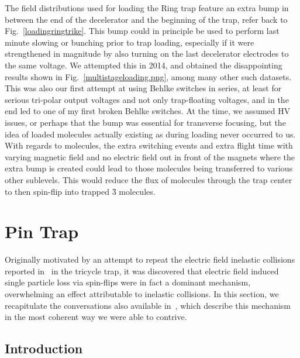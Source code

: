 The field distributions used for loading the Ring trap feature an extra bump in between the end of the decelerator and the beginning of the trap, refer back to Fig.~\ref{loadingringtrike}.
This bump could in principle be used to perform last minute slowing or bunching prior to trap loading, especially if it were strengthened in magnitude by also turning on the last decelerator electrodes to the same voltage.
We attempted this in 2014, and obtained the disappointing results shown in Fig.~\ref{multistageloading.png}, among many other such datasets.
This was also our first attempt at using Behlke switches in series, at least for serious tri-polar output voltages and not only trap-floating voltages, and in the end led to one of my first broken Behlke switches.
At the time, we assumed HV issues, or perhaps that the bump was essential for transverse focusing, but the idea of loaded molecules actually existing as  during loading never occurred to us.
With regards to  molecules, the extra switching events and extra flight time with varying magnetic field and no electric field out in front of the magnets where the extra bump is created could lead to those molecules being transferred to various other sublevels.
This would reduce the flux of  molecules through the trap center to then spin-flip into trapped \f3 molecules.



\section{Pin Trap}

Originally motivated by an attempt to repeat the electric field inelastic collisions reported in~\cite{Stuhl2013} in the tricycle trap, it was discovered that electric field induced single particle loss via spin-flips were in fact a dominant mechanism, overwhelming an effect attributable to inelastic collisions.
In this section, we recapitulate the conversations also available in~\cite{Reens2017}, which describe this mechanism in the most coherent way we were able to contrive.

\subsection{Introduction}


